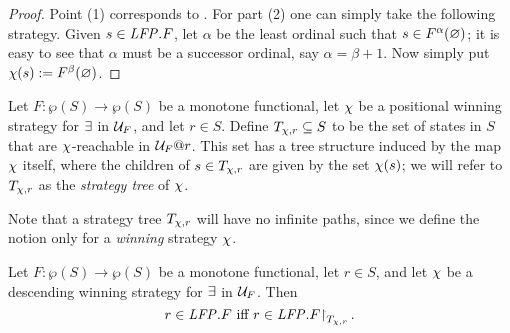 \begin{proof}
Point (1) corresponds to \cite[Theorem 3.14(2)]{Ven08}.
For part (2) one can simply take the following strategy.
Given $s \in \mathit{LFP}.F$, let $\alpha$ be the least ordinal such that $s \in 
F^{\alpha}(\varnothing)$; it is easy to see that $\alpha$ must be a successor ordinal,
say $\alpha = \beta + 1$. 
Now simply put $\chi(s) := F^{\beta}(\varnothing)$.
\end{proof}

\begin{definition}
\label{d:str-tree}
Let $F: \wp(S)\to \wp(S)$ be a monotone functional, let $\chi$ be a 
positional winning strategy for $\exists$ in $\mathcal{U}_{F}$, and let $r \in S$. 
Define $T_{\chi,r} \subseteq S$ to be the set of states in $S$ that are 
$\chi$-reachable in $\mathcal{U}_{F}@r$.
This set has a tree structure induced by the map $\chi$ itself, where the 
children of $s \in T_{\chi,r}$ are given by the set $\chi(s)$; we will
refer to $T_{\chi,r}$ as the \emph{strategy tree} of
$\chi$.
\end{definition}
Note that a strategy tree $T_{\chi,r}$ will have no infinite paths, since we
define the notion only for a \emph{winning} strategy $\chi$.

\begin{proposition}
\label{p:afmc-2}
Let $F: \wp(S)\to \wp(S)$ be a monotone functional, let $r \in S$, and let 
$\chi$ be a descending winning strategy for $\exists$ in $\mathcal{U}_{F}$.
Then
\begin{equation}
\label{eq:afmc3}
r \in \LFP. F \text{ iff } r \in \LFP. F\rst{T_{\ystrat,r}}.
\end{equation}
\end{proposition}

